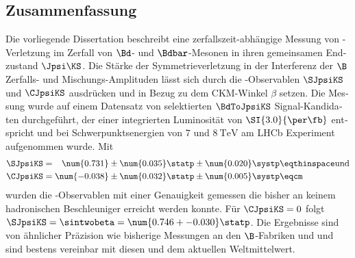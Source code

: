 \vspace{5ex}
\begin{german}
\section*{Zusammenfassung}
Die vorliegende Dissertation beschreibt eine zerfallszeit-abhängige Messung von
\CP-Verletzung im Zerfall von $\Bd$- und $\Bdbar$-Mesonen in ihren gemeinsamen
Endzustand $\Jpsi\KS$. Die Stärke der Symmetrieverletzung in der Interferenz der
$\B$ Zerfalls- und Mischungs-Amplituden lässt sich durch die \CP-Observablen
$\SJpsiKS$ und $\CJpsiKS$ ausdrücken und in Bezug zu dem \acs{CKM}-Winkel
$\beta$ setzen. Die Messung wurde auf einem Datensatz von selektierten
$\BdToJpsiKS$ Signal-Kandidaten durchgeführt, der einer integrierten Luminosität
von $\SI{3.0}{\per\fb}$ entspricht und bei Schwerpunktsenergien von $\num{7}$
und $\SI{8}{\TeV}$ am \acs{LHCb} Experiment aufgenommen wurde. Mit
%
\begin{equation*}
  \begin{split}
    \SJpsiKS &= \phantom{-}\num{0.731} \pm \num{0.035} \statp \pm \num{0.020} \systp \eqthinspace\text{und} \\
    \CJpsiKS &=           \num{-0.038} \pm \num{0.032} \statp \pm \num{0.005} \systp \eqcm
  \end{split}
\end{equation*}
%
wurden die \CP-Observablen mit einer Genauigkeit gemessen die bisher an keinem
hadronischen Beschleuniger erreicht werden konnte. Für $\CJpsiKS = 0$ folgt
$\SJpsiKS = \sintwobeta = \num{0.746 +- 0.030}\statp$. Die Ergebnisse sind von
ähnlicher Präzision wie bisherige Messungen an den $\B$-Fabriken \Babar und
\Belle und sind bestens vereinbar mit diesen und dem aktuellen Weltmittelwert.
\end{german}

\setcounter{page}{1}

